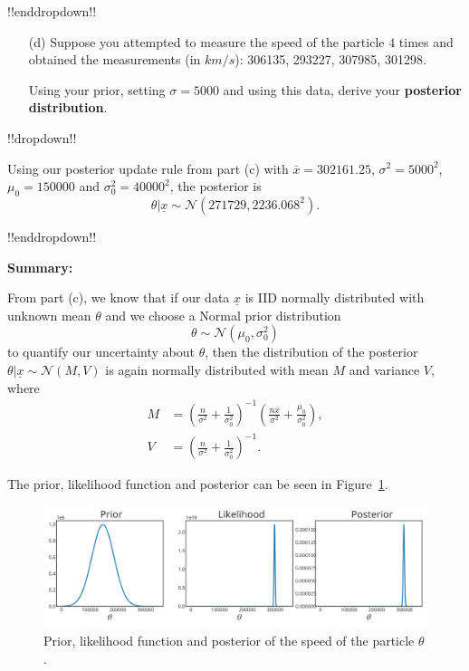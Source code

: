 {!!enddropdown!!

\clearpage

\begin{itemize}
\item [(d)] Suppose you attempted to measure the speed of the particle $4$ times and obtained the measurements (in $km/s$): 306135, 293227, 307985, 301298.

Using your prior, setting $\sigma = 5000$ and using this data, derive your \textbf{\color{darkblue}posterior distribution}.
\end{itemize}
!!dropdown!!

Using our posterior update rule from part (c) with $\bar{x} = 302161.25$, $\sigma^2 = 5000^2$, $\mu_0 = 150000$ and $\sigma_0^2 = 40000^2$, the posterior is
    $$ \theta | \underline{x} \sim \mathcal{N}(271729, 2236.068^2).$$

!!enddropdown!!

\textbf{Summary:}

From part (c), we know that if our data $\underline{x}$ is IID normally distributed with unknown mean $\theta$ and we choose a Normal prior distribution 
$$\theta \sim \mathcal{N}(\mu_0,\sigma^2_0)$$
to quantify our uncertainty about $\theta$, then the distribution of the posterior $\theta|\underline{x}\sim \mathcal{N}(M, V)$ is again normally distributed with mean $M$ and variance $V$, where
\begin{align*}
    M &= \left(\frac{n}{\sigma^2} + \frac{1}{\sigma_0^2}\right)^{-1}\left(\frac{n\bar{x}}{\sigma^2} + \frac{\mu_0}{\sigma_0^2}\right), \\
    V &= \left(\frac{n}{\sigma^2} + \frac{1}{\sigma_0^2}\right)^{-1}.
\end{align*}

The prior, likelihood function and posterior can be seen in Figure~\ref{fig:speed}.

\begin{figure}[h] 

\includegraphics{images/speed_priorposterior.svg}
\caption{Prior, likelihood function and posterior of the speed of the particle $\theta$.}

\label{fig:speed}
\end{figure}}


